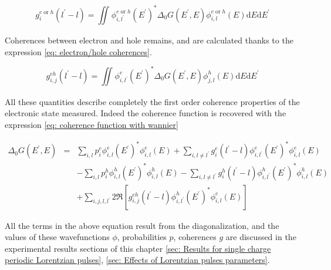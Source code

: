 \begin{equation}
g^{e\;\mathrm{or}\;h}_{i}\left(l^{\prime}-l\right) = \iint_{}^{} \phi^{e\;\mathrm{or}\;h}_{i,l^{\prime}}\left(E^{\prime}\right)^{\ast}\Delta_{0}G\left(E^{\prime},E\right)\phi^{e\;\mathrm{or}\;h}_{i,l}\left(E\right)\mathrm{d}E\mathrm{d}E^{\prime} \label{eq: inter-period coherences}
\end{equation}

Coherences between electron and hole remains, and are calculated thanks to the expression \eqref{eq: electron/hole coherences}.

\begin{equation}
g^{eh}_{i,j}\left(l^{\prime}-l\right) = \iint_{}^{} \phi^{e}_{i,l^{\prime}}\left(E^{\prime}\right)^{\ast}\Delta_{0}G\left(E^{\prime},E\right)\phi^{h}_{j,l}\left(E\right)\mathrm{d}E\mathrm{d}E^{\prime} \label{eq: electron/hole coherences}
\end{equation}

All these quantities describe completely the first order coherence properties of the electronic state measured.
Indeed the coherence function is recovered with the expression \eqref{eq: coherence function with wannier}

\begin{eqnarray}
\Delta_{0}G\left(E^\prime,E\right) & = & \sum_{i,l} p_i^{e}\phi^{e}_{i,l}\left(E^{\prime}\right)^{\ast}\phi^{e}_{i,l}\left(E\right)+\sum_{i,l\neq l^\prime} g_i^{e}(l^\prime-l)\phi^{e}_{i,l^\prime}\left(E^{\prime}\right)^{\ast}\phi^{e}_{i,l}\left(E\right) \\
 & & - \sum_{i,l} p_i^{h}\phi^{h}_{i,l}\left(E^{\prime}\right)^{\ast}\phi^{h}_{i,l}\left(E\right)-\sum_{i,l \neq l^\prime} g_i^{h}(l^\prime-l)\phi^{h}_{i,l^\prime}\left(E^{\prime}\right)^{\ast}\phi^{h}_{i,l}\left(E\right) \\
 & & +\sum_{i,j,l,l^\prime} 2\Re\left[ g_{i,j}^{eh}(l^\prime-l)\phi^{h}_{i,l^\prime}\left(E^{\prime}\right)^{\ast}\phi^{e}_{i,l}\left(E\right)\right] \label{eq: coherence function with wannier}
\end{eqnarray}

All the terms in the above equation  result from the diagonalization, and the values of these wavefunctions $\phi$, probabilities $p$, coherences $g$ are discussed in the experimental results sections of this chapter \ref{sec: Results for single charge periodic Lorentzian pulses}, \ref{sec: Effects of Lorentzian pulses parameters}. 


